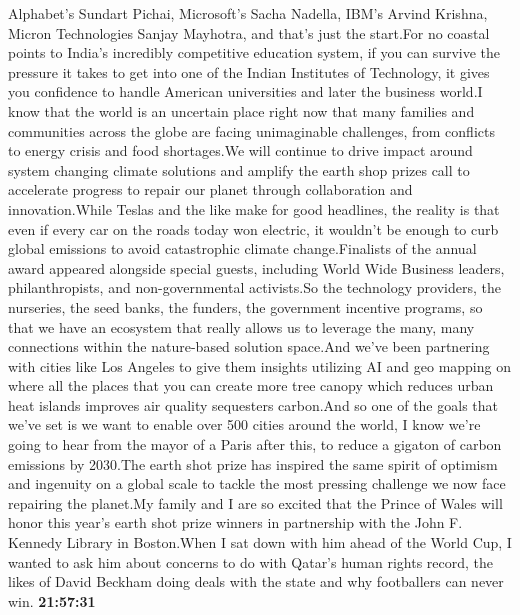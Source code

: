\documentclass{article}%
\begin{document}
Alphabet's Sundart Pichai, Microsoft's Sacha Nadella, IBM's Arvind Krishna, Micron Technologies Sanjay Mayhotra, and that's just the start.For no coastal points to India's incredibly competitive education system, if you can survive the pressure it takes to get into one of the Indian Institutes of Technology, it gives you confidence to handle American universities and later the business world.I know that the world is an uncertain place right now that many families and communities across the globe are facing unimaginable challenges, from conflicts to energy crisis and food shortages.We will continue to drive impact around system changing climate solutions and amplify the earth shop prizes call to accelerate progress to repair our planet through collaboration and innovation.While Teslas and the like make for good headlines, the reality is that even if every car on the roads today won electric, it wouldn't be enough to curb global emissions to avoid catastrophic climate change.Finalists of the annual award appeared alongside special guests, including World Wide Business leaders, philanthropists, and non{-}governmental activists.So the technology providers, the nurseries, the seed banks, the funders, the government incentive programs, so that we have an ecosystem that really allows us to leverage the many, many connections within the nature{-}based solution space.And we've been partnering with cities like Los Angeles to give them insights utilizing AI and geo mapping on where all the places that you can create more tree canopy which reduces urban heat islands improves air quality sequesters carbon.And so one of the goals that we've set is we want to enable over 500 cities around the world, I know we're going to hear from the mayor of a Paris after this, to reduce a gigaton of carbon emissions by 2030.The earth shot prize has inspired the same spirit of optimism and ingenuity on a global scale to tackle the most pressing challenge we now face repairing the planet.My family and I are so excited that the Prince of Wales will honor this year's earth shot prize winners in partnership with the John F. Kennedy Library in Boston.When I sat down with him ahead of the World Cup, I wanted to ask him about concerns to do with Qatar's human rights record, the likes of David Beckham doing deals with the state and why footballers can never win.%
\textbf{21:57:31}%
\newline%
\end{document}
